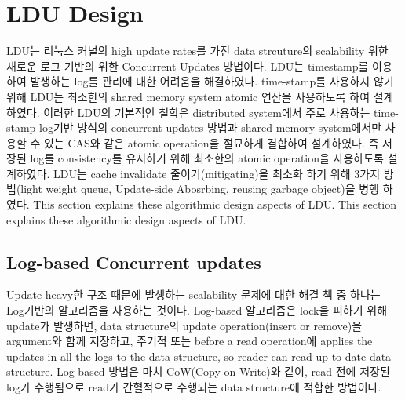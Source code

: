 \section{LDU Design}


\ifkor
LDU는 리눅스 커널의 high update rates를 가진 data strcuture의 scalability 위한 새로운 로그 기반의  위한
Concurrent Updates 방법이다.
LDU는 timestamp를 이용하여 발생하는 log를 관리에 대한 어려움을 해결하였다.
time-stamp를 사용하지 않기 위해 LDU는 최소한의 shared memory system atomic 연산을 사용하도록 하여 설계하였다.
이러한 LDU의 기본적인 철학은 distributed system에서 주로 사용하는 time-stamp log기반  방식의 concurrent
updates 방법과 shared memory system에서만 사용할 수 있는 CAS와 같은 atomic operation을 절묘하게
결합하여 설계하였다.
즉 저장된 log를 consistency를 유지하기 위해 최소한의 atomic operation을 사용하도록 설계하였다. 
LDU는 cache invalidate 줄이기(mitigating)을 최소화 하기 위해 3가지 방법(light weight queue, 
Update-side Abosrbing, reusing garbage object)을 병행 하였다.
This section explains these algorithmic design aspects of LDU.
\else
This section explains these algorithmic design aspects of LDU.
\fi



\subsection{Log-based Concurrent updates}


\ifkor
Update heavy한 구조 때문에 발생하는 scalability 문제에 대한 해결 책 중 하나는 Log기반의 알고리즘을 사용하는 것이다.
Log-based 알고리즘은 lock을 피하기 위해 update가 발생하면, data structure의 update
operation(insert or remove)을 argument와 함께 저장하고, 주기적 또는 before a read operation에
applies the updates in all the logs to the data structure, so reader can read up to date data structure.
Log-based 방법은 마치 CoW(Copy on Write)와 같이, read 전에 저장된 log가 수행됨으로 read가 간혈적으로
수행되는 data structure에 적합한 방법이다.
\else

